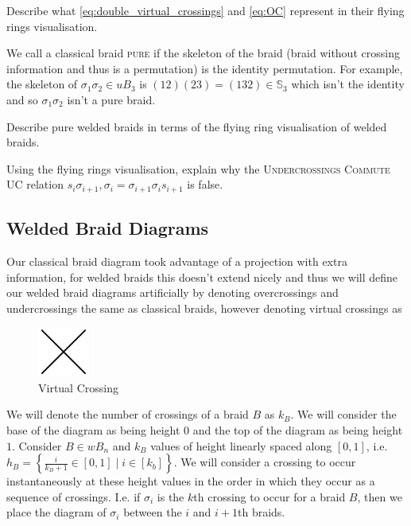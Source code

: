 \begin{Exercise}
    Describe what \cref{eq:double_virtual_crossings} and \cref{eq:OC} represent in their flying rings visualisation. 
\end{Exercise}
\begin{Exercise}
    We call a classical braid \textsc{pure} if the skeleton of the braid (braid without crossing information and thus is a permutation) is the identity permutation. 
    For example, the skeleton of \( \sigma_1 \sigma_2 \in uB_3 \) is \( (1 2)(2 3) = (1 3 2) \in \mathbb{S}_3 \) which isn't the identity and so \( \sigma_1 \sigma_2 \) isn't a pure braid. 
    
    Describe pure welded braids in terms of the flying ring visualisation of welded braids.
\end{Exercise}
\begin{Exercise} \label{ex:UC}
    Using the flying rings visualisation, explain why the \textsc{Undercrossings Commute} UC relation \( s_i \sigma_{i + 1} , \sigma_i = \sigma_{i + 1} \sigma_i s_{i + 1} \) is false. 
\end{Exercise}

\subsection{Welded Braid Diagrams}

Our classical braid diagram took advantage of a projection with extra information, for welded braids this doesn't extend nicely and thus we will define our welded braid diagrams artificially by denoting overcrossings and undercrossings the same as classical braids, however denoting virtual crossings as

\begin{figure}[H]
    \centering
    \includegraphics[width=0.15\textwidth]{images/welded_braids/1_welded_virtual_crossing.png}
    \caption{Virtual Crossing}
    \label{fig:virtual_crossing}
\end{figure}

We will denote the number of crossings of a braid \( B \) as \( k_B \). 
We will consider the base of the diagram as being height \( 0 \) and the top of the diagram as being height \( 1 \). 
Consider \( B \in wB_n \) and \( k_B \) values of height linearly spaced along \( [0, 1] \), i.e. \( h_B = \left\{ \frac{i}{k_B + 1} \in [0, 1] \mid i \in [k_b] \right\} \).
We will consider a crossing to occur instantaneously at these height values in the order in which they occur as a sequence of crossings. 
I.e. if \( \sigma_i \) is the \( k \)th crossing to occur for a braid \( B \), then we place the diagram of \( \sigma_i \) between the \( i \) and \( i + 1 \)th braids. \label{par:wb_diagram}

